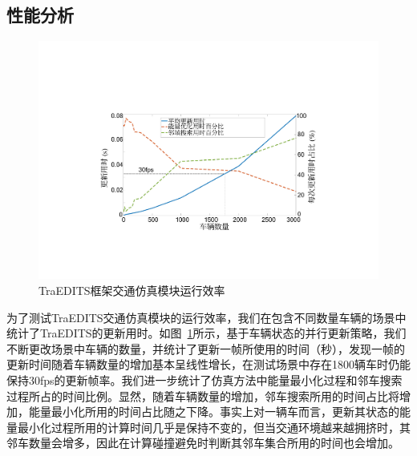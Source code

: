 \subsection{性能分析}
\label{section:traedits_performance}

\begin{figure}[!tbh]
\centering
    \centering
    \includegraphics[width=0.78\columnwidth]{figure/traedits/performance simulation 4_cn.pdf}
    \caption[TraEDITS框架交通仿真模块运行效率]{TraEDITS框架交通仿真模块运行效率}
    \label{fig:traedits_simperform}
\end{figure}


为了测试TraEDITS交通仿真模块的运行效率，我们在包含不同数量车辆的场景中统计了TraEDITS的更新用时。如图~\ref{fig:traedits_simperform}所示，基于车辆状态的并行更新策略，我们不断更改场景中车辆的数量，并统计了更新一帧所使用的时间（秒），发现一帧的更新时间随着车辆数量的增加基本呈线性增长，在测试场景中存在1800辆车时仍能保持30fps的更新帧率。我们进一步统计了仿真方法中能量最小化过程和邻车搜索过程所占的时间比例。显然，随着车辆数量的增加，邻车搜索所用的时间占比将增加，能量最小化所用的时间占比随之下降。事实上对一辆车而言，更新其状态的能量最小化过程所用的计算时间几乎是保持不变的，但当交通环境越来越拥挤时，其邻车数量会增多，因此在计算碰撞避免时判断其邻车集合所用的时间也会增加。



